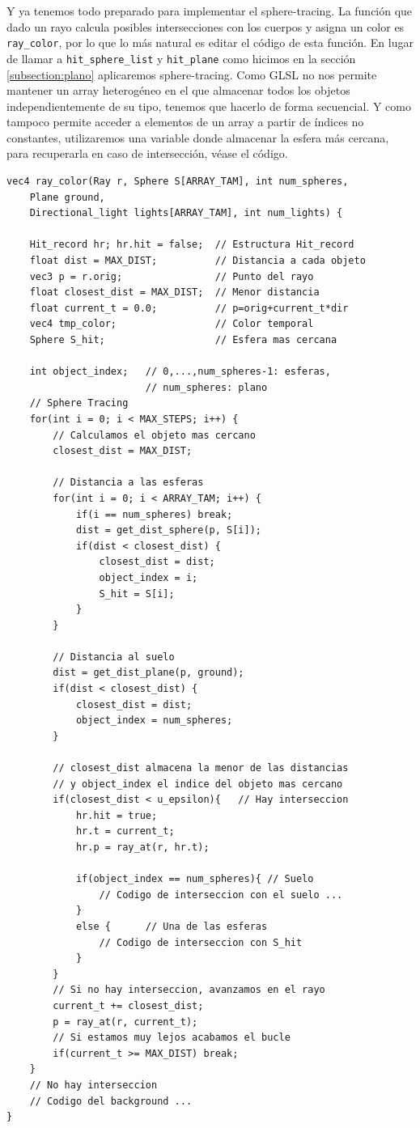 Y ya tenemos todo preparado para implementar el sphere-tracing. La función que dado un rayo calcula posibles intersecciones con los cuerpos y asigna un color es \verb|ray_color|, por lo que lo más natural es editar el código de esta función. En lugar de llamar a \verb|hit_sphere_list| y \verb|hit_plane| como hicimos en la sección \ref{subsection:plano} aplicaremos sphere-tracing. Como GLSL no nos permite mantener un array heterogéneo en el que almacenar todos los objetos independientemente de su tipo, tenemos que hacerlo de forma secuencial. Y como tampoco permite acceder a elementos de un array a partir de índices no constantes, utilizaremos una variable donde almacenar la esfera más cercana, para recuperarla en caso de intersección, véase el código.

\begin{lstlisting}
vec4 ray_color(Ray r, Sphere S[ARRAY_TAM], int num_spheres, 
    Plane ground,
    Directional_light lights[ARRAY_TAM], int num_lights) {
    
    Hit_record hr; hr.hit = false;  // Estructura Hit_record
    float dist = MAX_DIST;          // Distancia a cada objeto 
    vec3 p = r.orig;                // Punto del rayo
    float closest_dist = MAX_DIST;  // Menor distancia
    float current_t = 0.0;          // p=orig+current_t*dir
    vec4 tmp_color;                 // Color temporal
    Sphere S_hit;                   // Esfera mas cercana
    
    int object_index;   // 0,...,num_spheres-1: esferas,
                        // num_spheres: plano
    // Sphere Tracing
    for(int i = 0; i < MAX_STEPS; i++) {
        // Calculamos el objeto mas cercano
        closest_dist = MAX_DIST;

        // Distancia a las esferas
        for(int i = 0; i < ARRAY_TAM; i++) {
            if(i == num_spheres) break;
            dist = get_dist_sphere(p, S[i]);
            if(dist < closest_dist) {
                closest_dist = dist;
                object_index = i;
                S_hit = S[i];
            }
        }

        // Distancia al suelo
        dist = get_dist_plane(p, ground);
        if(dist < closest_dist) {
            closest_dist = dist;
            object_index = num_spheres;
        }
    
        // closest_dist almacena la menor de las distancias
        // y object_index el indice del objeto mas cercano
        if(closest_dist < u_epsilon){   // Hay interseccion
            hr.hit = true;
            hr.t = current_t;
            hr.p = ray_at(r, hr.t);

            if(object_index == num_spheres){ // Suelo
                // Codigo de interseccion con el suelo ...
            }
            else {      // Una de las esferas
                // Codigo de interseccion con S_hit
            }
        }
        // Si no hay interseccion, avanzamos en el rayo
        current_t += closest_dist;
        p = ray_at(r, current_t);
        // Si estamos muy lejos acabamos el bucle
        if(current_t >= MAX_DIST) break;
    }
    // No hay interseccion
    // Codigo del background ...       
}
\end{lstlisting}

